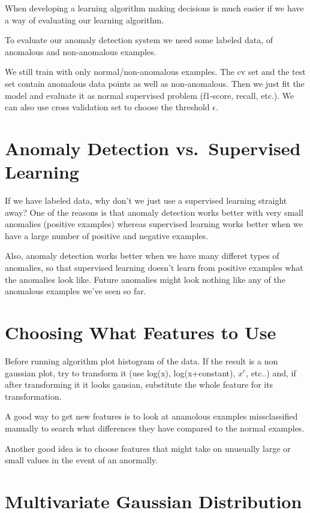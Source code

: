 \documentclass[10pt]{extarticle}
\begin{document}
When developing a learning algorithm making decisions is much easier if
we have a way of evaluating our learning algorithm. \smallskip

To evaluate our anomaly detection system we need some labeled data, of
anomalous and non-anomalous examples.

We still train with only normal/non-anomalous examples. The cv set and
the test set contain anomalous data points as well as non-anomalous.
Then we just fit the model and evaluate it as normal supervised problem
(f1-score, recall, etc.). We can also use cross validation set to choose
the threshold $\epsilon$.

\section{Anomaly Detection vs.~Supervised
Learning}\label{anomaly-detection-vs.supervised-learning}

If we have labeled data, why don't we just use a supervised learning
straight away? One of the reasons is that anomaly detection works better
with very small anomalies (positive examples) whereas supervised
learning works better when we have a large number of positive and
negative examples.

Also, anomaly detection works better when we have many differet types of
anomalies, so that supervised learning doesn't learn from positive
examples what the anomalies look like. Future anomalies might look
nothing like any of the anomalous examples we've seen so far.

\section{Choosing What Features to
Use}\label{choosing-what-features-to-use}

Before running algorithm plot histogram of the data. If the result is a
non gaussian plot, try to transform it (use log(x), log(x+constant),
$x^c$, etc..) and, if after transforming it it looks gausian, substitute
the whole feature for its transformation. \bigskip

A good way to get new features is to look at anamolous examples
missclassified manually to search what differences they have compared to
the normal examples. \bigskip

Another good idea is to choose features that might take on unusually
large or small values in the event of an anormally.

\section{Multivariate Gaussian
Distribution}\label{multivariate-gaussian-distribution}
\end{document}

